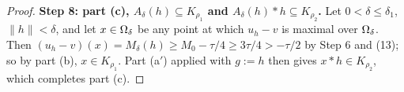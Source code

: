 \begin{proof}
\medskip\noindent\textbf{Step 8: part (c), $A_\delta(h)\subseteq K_{\rho_1}$ and
$A_\delta(h)*h\subseteq K_{\rho_2}$.} Let $0<\delta\le\delta_1$, $\|h\|<\delta$, and let
$x\in\Omega_\delta$ be any point at which $u_h-v$ is maximal over $\Omega_\delta$. Then
$(u_h-v)(x)=M_\delta(h)\ge M_0-\tau/4\ge3\tau/4>-\tau/2$ by Step 6 and (13); so by part
(b), $x\in K_{\rho_1}$. Part (a$'$) applied with $g:=h$ then gives $x*h\in K_{\rho_2}$,
which completes part (c).
\end{proof}

